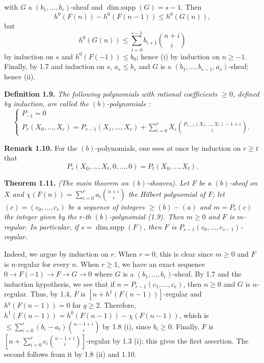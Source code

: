 %
with \(G\) a \((b_1,\ldots,b_r)\)-sheaf and \(\operatorname{dim{.}supp}(G)=s-1\). Then
\[
h^0(F(n))-h^0(F(n-1))\le h^0(G(n)),
\]
but
\[
h^0(G(n))\le\sum_{i=0}^{s-1}b_{i+1}\binom{n+i}{i}
\]
by induction on \(s\) and \(h^0(F(-1))\le b_0\); hence (i) by induction on \(n\ge -1\). Finally, by 1.7 and induction on \(s\), \(a_s\le b_s\) and \(G\) is a \((b_1,\ldots,b_{s-1},a_s)\)-sheaf; hence (ii).

\textbf{Definition 1.9.} \emph{The following polynomials with rational coefficients \(\ge0\), defined by induction, are called the \emph{\((b)\)-polynomials}}~:
\[
\begin{cases}
P_{-1}=0\\
P_r(X_0,\ldots,X_r)=P_{r-1}(X_1,\ldots,X_r)
+\displaystyle\sum_{i=0}^{r}X_i
\binom{P_{r-1}(X_1,\ldots,X_r)-1+i}{i}.
\end{cases}
\]

\textbf{Remark 1.10.} For the \((b)\)-polynomials, one sees at once by induction on \(r\ge t\) that
\[
P_r(X_0,\ldots,X_t,0,\ldots,0)=P_t(X_0,\ldots,X_t).
\]

\textbf{Theorem 1.11.} \emph{(The main theorem on \((b)\)-sheaves). Let \(F\) be a \((b)\)-sheaf on \(X\) and \(\chi(F(n))=\sum_{i=0}^{r}a_i\binom{n+i}{i}\) the Hilbert polynomial of \(F\); let \((c)=(c_0,\ldots,c_r)\) be a sequence of integers \(\ge (b)-(a)\) and \(m=P_r(c)\) the integer given by the \(r\)-th \((b)\)-polynomial (1.9). Then \(m\ge0\) and \(F\) is \(m\)-regular. In particular, if \(s=\operatorname{dim{.}supp}(F)\), then \(F\) is \(P_{s-1}(c_0,\ldots,c_{s-1})\)-regular.}

%
Indeed, we argue by induction on \(r\). When \(r=0\), this is clear since \(m\ge0\) and \(F\) is \(n\)-regular for every \(n\). When \(r\ge1\), we have an exact sequence $0\longrightarrow F(-1)\longrightarrow F\longrightarrow G\longrightarrow0$ where \(G\) is a \((b_1,\ldots,b_r)\)-sheaf. By 1.7 and the induction hypothesis, we see that if \(n=P_{r-1}(c_1,\ldots,c_r)\), then \(n\ge0\) and \(G\) is \(n\)-regular. Thus, by 1.4, \(F\) is \([n+h^1(F(n-1))]\)-regular and \(h^q(F(n-1))=0\) for \(q\ge2\). Therefore, \(h^1(F(n-1))=h^0(F(n-1))-\chi(F(n-1))\), which is \(\le \sum_{i=0}^{r}(b_i-a_i)\binom{n-1+i}{i}\) by 1.8 (i), since \(b_i\ge0\). Finally, \(F\) is \(\left[n+\sum_{i=0}^{r}c_i\binom{n-1+i}{i}\right]\)-regular by 1.3 (i); this gives the first assertion. The second follows from it by 1.8 (ii) and 1.10.

